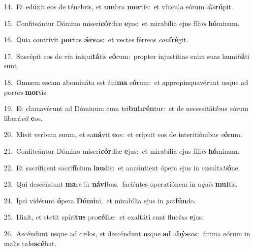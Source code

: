 {\numbfont\textcolor{\numbcolor}{14.}}~Et edúxit eos de ténebris, et \textbf{um}\-bra \textbf{mor}\-tis:~\star et víncula eórum \textit{dis}\-\textbf{rú}pit.\par
{\numbfont\textcolor{\numbcolor}{15.}}~Confiteántur Dómino miseri\-\textbf{cór}\-diæ \textbf{e}\-jus:~\star et mirabília ejus fíli\textit{is} \textbf{hó}\-minum.\par
{\numbfont\textcolor{\numbcolor}{16.}}~Quia contrívit \textbf{por}\-tas \textbf{ǽ}\-\textbf{re}as:~\star et vectes férreos \textit{con}\-\textbf{fré}git.\par
{\numbfont\textcolor{\numbcolor}{17.}}~Suscépit eos de via iniqui\-\textbf{tá}\-tis e\-\textbf{ó}\-rum:~\star propter injustítias enim suas humi\-\textit{li}\-\textbf{á}ti sunt.\par
{\numbfont\textcolor{\numbcolor}{18.}}~Omnem escam abomináta est áni\textbf{ma} e\-\textbf{ó}\-rum:~\star et appropinquavérunt usque ad por\textit{tas} \textbf{mor}\-tis.\par
{\numbfont\textcolor{\numbcolor}{19.}}~Et clamavérunt ad Dóminum cum tri\-\textbf{bu}\-la\-\textbf{rén}\-tur:~\star et de necessitátibus eórum liberá\textit{vit} \textbf{e}\-os.\par
{\numbfont\textcolor{\numbcolor}{20.}}~Misit verbum suum, et sa\-\textbf{ná}\-vit \textbf{e}\-os:~\star et erípuit eos de interitiónibus \textit{e}\-\textbf{ó}rum.\par
{\numbfont\textcolor{\numbcolor}{21.}}~Confiteántur Dómino miseri\-\textbf{cór}\-diæ \textbf{e}\-jus:~\star et mirabília ejus fíli\textit{is} \textbf{hó}\-minum.\par
{\numbfont\textcolor{\numbcolor}{22.}}~Et sacríficent sacri\-\textbf{fí}\-cium \textbf{lau}\-dis:~\star et annúntient ópera ejus in exsulta\-\textit{ti}\-\textbf{ó}ne.\par
{\numbfont\textcolor{\numbcolor}{23.}}~Qui descéndunt \textbf{ma}\-re in \textbf{ná}\-\textbf{vi}bus,~\star faciéntes operatiónem in a\textit{quis} \textbf{mul}\-tis.\par
{\numbfont\textcolor{\numbcolor}{24.}}~Ipsi vidérunt \textbf{ó}\-pera \textbf{Dó}\-\textbf{mi}ni,~\star et mirabília ejus in \textit{pro}\-\textbf{fún}do.\par
{\numbfont\textcolor{\numbcolor}{25.}}~Dixit, et stetit spíri\textbf{tus} pro\-\textbf{cél}\-læ:~\star et exaltáti sunt fluc\textit{tus} \textbf{e}\-jus.\par
{\numbfont\textcolor{\numbcolor}{26.}}~Ascéndunt usque ad cælos, et descéndunt usque \textbf{ad} a\-\textbf{býs}\-sos:~\star ánima eórum in malis ta\-\textit{be}\-\textbf{scé}bat.\par
